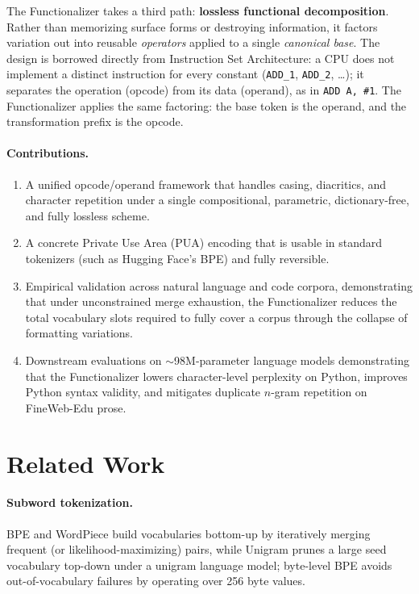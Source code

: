 \documentclass{article}
\begin{document}
The Functionalizer takes a third path: \textbf{lossless functional decomposition}. Rather than memorizing surface forms or destroying information, it factors variation out into reusable \emph{operators} applied to a single \emph{canonical base}. The design is borrowed directly from Instruction Set Architecture: a CPU does not implement a distinct instruction for every constant (\texttt{ADD\_1}, \texttt{ADD\_2}, \dots); it separates the operation (opcode) from its data (operand), as in \texttt{ADD A, \#1}. The Functionalizer applies the same factoring: the base token is the operand, and the transformation prefix is the opcode.

\paragraph{Contributions.}
\begin{enumerate}
    \item A unified opcode/operand framework that handles casing, diacritics, and character repetition under a single compositional, parametric, dictionary-free, and fully lossless scheme.
    \item A concrete Private Use Area (PUA) encoding that is usable in standard tokenizers (such as Hugging Face's BPE) and fully reversible.
    \item Empirical validation across natural language and code corpora, demonstrating that under unconstrained merge exhaustion, the Functionalizer reduces the total vocabulary slots required to fully cover a corpus through the collapse of formatting variations.
    \item Downstream evaluations on $\sim$98M-parameter language models demonstrating that the Functionalizer lowers character-level perplexity on Python, improves Python syntax validity, and mitigates duplicate $n$-gram repetition on FineWeb-Edu prose.
\end{enumerate}

\section{Related Work}

\paragraph{Subword tokenization.} BPE \citep{sennrich2016} and WordPiece \citep{schuster2012} build vocabularies bottom-up by iteratively merging frequent (or likelihood-maximizing) pairs, while Unigram \citep{kudo2018} prunes a large seed vocabulary top-down under a unigram language model; byte-level BPE \citep{radford2019} avoids out-of-vocabulary failures by operating over 256 byte values.
\end{document}
